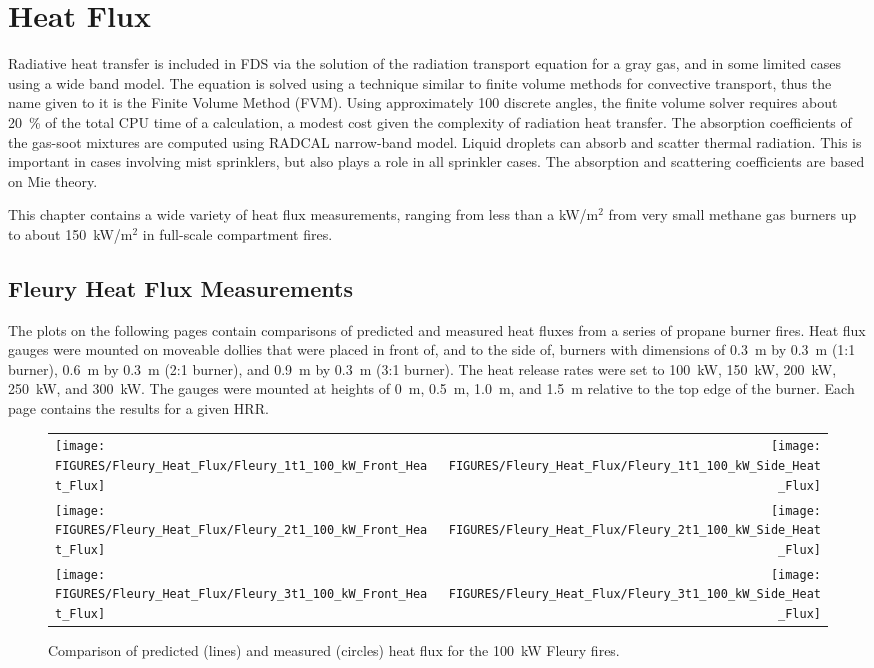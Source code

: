\chapter{Heat Flux}

Radiative heat transfer is included in FDS via the solution of the radiation transport equation for a gray gas, and in some limited cases using a wide band model.  The equation is solved using a technique similar to finite volume methods for convective transport, thus the name given to it is
the Finite Volume Method (FVM).  Using approximately 100 discrete angles, the finite volume solver requires about 20~\% of the total CPU time of a calculation, a modest cost given the complexity of radiation heat transfer. The absorption coefficients of the gas-soot mixtures are computed using RADCAL narrow-band model.  Liquid droplets can absorb and scatter thermal radiation. This is important in cases involving mist sprinklers, but also plays a role in all sprinkler cases.  The absorption and scattering coefficients are based on Mie theory.

This chapter contains a wide variety of heat flux measurements, ranging from less than a kW/m$^2$ from very small methane gas burners up to about 150~kW/m$^2$ in full-scale compartment fires.


\clearpage

\section{Fleury Heat Flux Measurements}

The plots on the following pages contain comparisons of predicted and measured heat fluxes from a series of propane burner fires. Heat flux gauges were mounted on moveable dollies that were placed in front of, and to the side of, burners with dimensions of 0.3~m by 0.3~m (1:1 burner), 0.6~m by 0.3~m (2:1 burner), and 0.9~m by 0.3~m (3:1 burner). The heat release rates were set to 100~kW, 150~kW, 200~kW, 250~kW, and 300~kW. The gauges were mounted at heights of 0~m, 0.5~m, 1.0~m, and 1.5~m relative to the top edge of the burner. Each page contains the results for a given HRR.



\begin{figure}[h!]
\begin{tabular*}{\textwidth}{l@{\extracolsep{\fill}}r}
\texttt{[image: FIGURES/Fleury\_Heat\_Flux/Fleury\_1t1\_100\_kW\_Front\_Heat\_Flux]} &
\texttt{[image: FIGURES/Fleury\_Heat\_Flux/Fleury\_1t1\_100\_kW\_Side\_Heat\_Flux]} \\
\texttt{[image: FIGURES/Fleury\_Heat\_Flux/Fleury\_2t1\_100\_kW\_Front\_Heat\_Flux]} &
\texttt{[image: FIGURES/Fleury\_Heat\_Flux/Fleury\_2t1\_100\_kW\_Side\_Heat\_Flux]} \\
\texttt{[image: FIGURES/Fleury\_Heat\_Flux/Fleury\_3t1\_100\_kW\_Front\_Heat\_Flux]} &
\texttt{[image: FIGURES/Fleury\_Heat\_Flux/Fleury\_3t1\_100\_kW\_Side\_Heat\_Flux]}
\end{tabular*}
\label{Fleury_Heat_Flux_100_kW}
\caption[Fleury Heat Flux, 100 kW fires.]
{Comparison of predicted (lines) and measured (circles) heat flux for the 100~kW Fleury fires.}
\end{figure}

